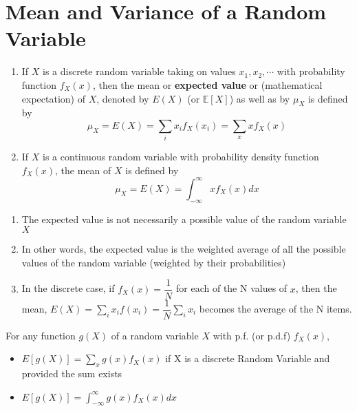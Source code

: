 \section{Mean and Variance of a Random Variable}

\begin{definition}
\hfill
\begin{enumerate}
    \item If $X$ is a discrete random variable taking on values $x_1, x_2, \cdots$ with probability function $f_X(x)$, then the mean or \textbf{expected value} or (mathematical expectation) of $X$, denoted by $E(X)$ (or $\mathbb{E}[X]$) as well as by $\mu_X$ is defined by 
    $$
    \mu_X = E(X) = \sum_i x_i f_X(x_i) = \sum_x xf_X(x)
    $$
    \item If $X$ is a continuous random variable with probability density function $f_X(x)$, the mean of $X$ is defined by
    $$
    \mu_X = E(X) = \int_{-\infty}^{\infty} xf_X(x)dx
    $$
\end{enumerate}
\end{definition}

\begin{note}
\end{note}
\begin{enumerate}
    \item The expected value is not necessarily a possible value of the random variable $X$
    \item In other words, the expected value is the weighted average of all the possible values of the random variable (weighted by their probabilities)
    \item In the discrete case, if $f_X(x) = \dfrac{1}{N}$ for each of the N values of $x$, then the mean, $E(X) = \sum_i x_i f(x_i) = \dfrac{1}{N} \sum_i x_i$ becomes the average of the N items.
\end{enumerate}

\begin{definition}
For any function $g(X)$ of a random variable $X$ with p.f. (or p.d.f) $f_X(x)$,
\begin{itemize}
    \item $E[g(X)] = \sum_x g(x) f_X(x)$ if X is a discrete Random Variable and provided the sum exists
    \item $E[g(X)] = \int_{-\infty}^{\infty} g(x)f_X(x)dx$
\end{itemize}
\end{definition}

